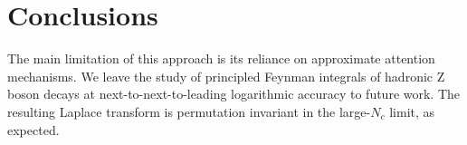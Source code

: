 \section{Conclusions}\label{sec:conclusions}

The main limitation of this approach is its reliance on approximate
attention mechanisms. We leave the study of principled Feynman integrals
of hadronic Z boson decays at next-to-next-to-leading logarithmic
accuracy to future work. The resulting Laplace transform is permutation
invariant in the large-$N_c$ limit, as expected.

